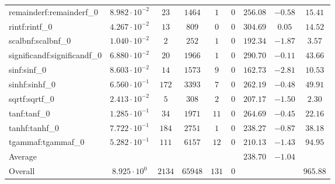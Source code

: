 \begin{tabular}{|l|c|c|c|c|c|c|c|c|}
remainderf:remainderf\_0     & $ 8.982 \cdot 10^{-2} $ & $ 23     $ & $ 1464  $ & $ 1   $ & $ 0   $ & $ 256.08      $ & $ -0.58   $ & $ 15.41   $ \\
rintf:rintf\_0               & $ 4.267 \cdot 10^{-2} $ & $ 13     $ & $ 809   $ & $ 0   $ & $ 0   $ & $ 304.69      $ & $ 0.05    $ & $ 14.52   $ \\
scalbnf:scalbnf\_0           & $ 1.040 \cdot 10^{-2} $ & $ 2      $ & $ 252   $ & $ 1   $ & $ 0   $ & $ 192.34      $ & $ -1.87   $ & $ 3.57    $ \\
significandf:significandf\_0 & $ 6.880 \cdot 10^{-2} $ & $ 20     $ & $ 1966  $ & $ 1   $ & $ 0   $ & $ 290.70      $ & $ -0.11   $ & $ 43.66   $ \\
sinf:sinf\_0                 & $ 8.603 \cdot 10^{-2} $ & $ 14     $ & $ 1573  $ & $ 9   $ & $ 0   $ & $ 162.73      $ & $ -2.81   $ & $ 10.53   $ \\
sinhf:sinhf\_0               & $ 6.560 \cdot 10^{-1} $ & $ 172    $ & $ 3393  $ & $ 7   $ & $ 0   $ & $ 262.19      $ & $ -0.48   $ & $ 49.91   $ \\
sqrtf:sqrtf\_0               & $ 2.413 \cdot 10^{-2} $ & $ 5      $ & $ 308   $ & $ 2   $ & $ 0   $ & $ 207.17      $ & $ -1.50   $ & $ 2.30    $ \\
tanf:tanf\_0                 & $ 1.285 \cdot 10^{-1} $ & $ 34     $ & $ 1971  $ & $ 11  $ & $ 0   $ & $ 264.69      $ & $ -0.45   $ & $ 22.16   $ \\
tanhf:tanhf\_0               & $ 7.722 \cdot 10^{-1} $ & $ 184    $ & $ 2751  $ & $ 1   $ & $ 0   $ & $ 238.27      $ & $ -0.87   $ & $ 38.18   $ \\
tgammaf:tgammaf\_0           & $ 5.282 \cdot 10^{-1} $ & $ 111    $ & $ 6157  $ & $ 12  $ & $ 0   $ & $ 210.13      $ & $ -1.43   $ & $ 94.95   $ \\
\hline
Average                      & $                     $ & $        $ & $       $ & $     $ & $     $ & $ 238.70      $ & $ -1.04   $ & $         $ \\
\hline
Overall                      & $ 8.925 \cdot 10^{0}  $ & $ 2134   $ & $ 65948 $ & $ 131 $ & $ 0   $ & $             $ & $         $ & $ 965.88  $ \\
\hline
\end{tabular}
